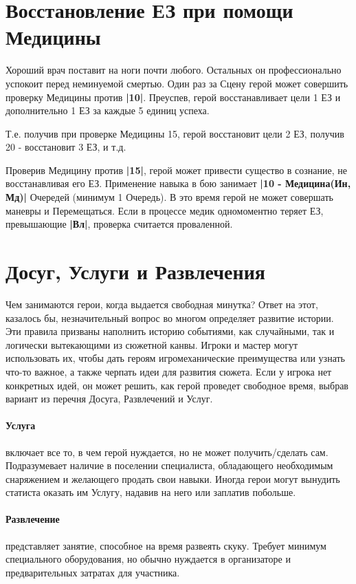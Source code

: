 \section{Восстановление ЕЗ при помощи Медицины}
Хороший врач поставит на ноги почти любого. Остальных он профессионально успокоит перед неминуемой смертью.
\newline Один раз за Сцену герой может совершить проверку Медицины против \textbf{|10|}. Преуспев, герой восстанавливает цели 1 ЕЗ и дополнительно 1 ЕЗ за каждые 5 единиц успеха.
\begin{tcolorbox}
  Т.е. получив при проверке Медицины 15, герой восстановит цели 2 ЕЗ, получив 20 - восстановит 3 ЕЗ, и т.д.
\end{tcolorbox}
Проверив Медицину против \textbf{|15|}, герой может привести существо в сознание, не восстанавливая его ЕЗ. 
\newline Применение навыка в бою занимает \textbf{|10 - Медицина(Ин, Мд)|} Очередей (минимум 1 Очередь). В это время герой не может совершать маневры и Перемещаться. Если в процессе медик одномоментно теряет ЕЗ, превышающие \textbf{|Вл|}, проверка считается проваленной. 

\section{Досуг, Услуги и Развлечения}
Чем занимаются герои, когда выдается свободная минутка? Ответ на этот, казалось бы, незначительный вопрос во многом определяет развитие истории. 
\newline Эти правила призваны наполнить историю событиями, как случайными, так и логически вытекающими из сюжетной канвы. Игроки и мастер могут использовать их, чтобы дать героям игромеханические преимущества или узнать что-то важное, а также черпать идеи для развития сюжета. 
\newline Если у игрока нет конкретных идей, он может решить, как герой проведет свободное время, выбрав вариант из перечня Досуга, Развлечений и Услуг.

\paragraph{Услуга} включает все то, в чем герой нуждается, но не может получить/сделать сам. Подразумевает наличие в поселении специалиста, обладающего необходимым снаряжением и желающего продать свои навыки. Иногда герои могут вынудить статиста оказать им Услугу, надавив на него или заплатив побольше.
\paragraph{Развлечение} представляет занятие, способное на время развеять скуку. Требует минимум специального оборудования, но обычно нуждается в организаторе и предварительных затратах для участника. 
